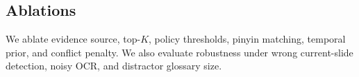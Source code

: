 \subsection{Ablations}

We ablate evidence source, top-$K$, policy thresholds, pinyin matching, temporal prior, and conflict penalty.  We also evaluate robustness under wrong current-slide detection, noisy OCR, and distractor glossary size.

